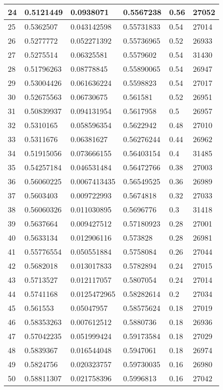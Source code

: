 \begin{longtable}{|l|l|l|l|l|l|}
24 & 0.5121449 & 0.0938071 & 0.5567238 & 0.56 & 27052 \\ \hline 
25 & 0.5362507 & 0.043142598 & 0.55731833 & 0.54 & 27014 \\ \hline 
26 & 0.5277772 & 0.052271392 & 0.55736965 & 0.52 & 26933 \\ \hline 
27 & 0.5275514 & 0.06325581 & 0.5579602 & 0.54 & 31430 \\ \hline 
28 & 0.51796263 & 0.08778845 & 0.55890065 & 0.54 & 26947 \\ \hline 
29 & 0.53004426 & 0.061636224 & 0.5598823 & 0.54 & 27017 \\ \hline 
30 & 0.52675563 & 0.06730675 & 0.561581 & 0.52 & 26951 \\ \hline 
31 & 0.50839937 & 0.094131954 & 0.5617958 & 0.5 & 26957 \\ \hline 
32 & 0.5310165 & 0.058596354 & 0.5622942 & 0.48 & 27010 \\ \hline 
33 & 0.5311676 & 0.06381627 & 0.56276244 & 0.44 & 26962 \\ \hline 
34 & 0.51915056 & 0.073666155 & 0.56403154 & 0.4 & 31485 \\ \hline 
35 & 0.54257184 & 0.046531484 & 0.56472766 & 0.38 & 27003 \\ \hline 
36 & 0.56060225 & 0.0067413435 & 0.56549525 & 0.36 & 26989 \\ \hline 
37 & 0.5603403 & 0.009722993 & 0.5674818 & 0.32 & 27033 \\ \hline 
38 & 0.56060326 & 0.011030895 & 0.5696776 & 0.3 & 31418 \\ \hline 
39 & 0.5637664 & 0.009427512 & 0.57180923 & 0.28 & 27001 \\ \hline 
40 & 0.5633134 & 0.012906116 & 0.573828 & 0.28 & 26981 \\ \hline 
41 & 0.55776554 & 0.050551884 & 0.5758084 & 0.26 & 27044 \\ \hline 
42 & 0.5682018 & 0.013017833 & 0.5782894 & 0.24 & 27015 \\ \hline 
43 & 0.5713527 & 0.012117057 & 0.5807054 & 0.24 & 27014 \\ \hline 
44 & 0.5741168 & 0.0125472965 & 0.58282614 & 0.2 & 27034 \\ \hline 
45 & 0.561553 & 0.05047957 & 0.58575624 & 0.18 & 27019 \\ \hline 
46 & 0.58353263 & 0.007612512 & 0.5880736 & 0.18 & 26936 \\ \hline 
47 & 0.57042235 & 0.051999424 & 0.59173584 & 0.18 & 27029 \\ \hline 
48 & 0.5839367 & 0.016544048 & 0.5947061 & 0.18 & 26974 \\ \hline 
49 & 0.5824756 & 0.020323757 & 0.59730035 & 0.16 & 26980 \\ \hline 
50 & 0.58811307 & 0.021758396 & 0.5996813 & 0.16 & 27042 \\ \hline 
\end{longtable}